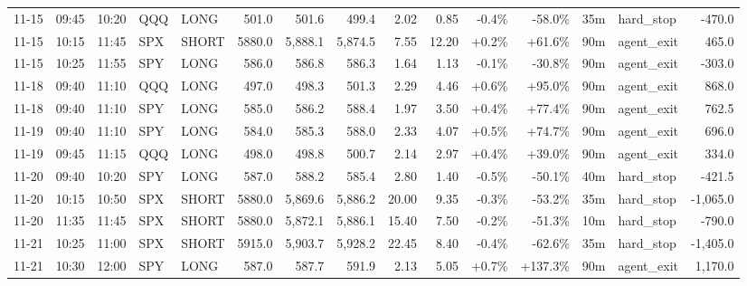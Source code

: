 \documentclass[11pt,a4paper,twoside]{article}
\begin{document}
\begin{landscape}
\begin{center}
\begin{longtable}{>{\color{txtmain}}l l l l l r r r r r r r r >{\color{txtmain}}l r}
11-15 & 09:45 & 10:20 & QQQ & LONG & 501.0 & 501.6 & 499.4 & 2.02 & 0.85 & \textcolor{lossred}{-0.4\%} & \textcolor{lossred}{-58.0\%} & 35m & hard\_stop & \textcolor{lossred}{-470.0} \\
11-15 & 10:15 & 11:45 & SPX & SHORT & 5880.0 & 5,888.1 & 5,874.5 & 7.55 & 12.20 & \textcolor{wingreen}{+0.2\%} & \textcolor{wingreen}{+61.6\%} & 90m & agent\_exit & \textcolor{wingreen}{465.0} \\
11-15 & 10:25 & 11:55 & SPY & LONG & 586.0 & 586.8 & 586.3 & 1.64 & 1.13 & \textcolor{lossred}{-0.1\%} & \textcolor{lossred}{-30.8\%} & 90m & agent\_exit & \textcolor{lossred}{-303.0} \\
11-18 & 09:40 & 11:10 & QQQ & LONG & 497.0 & 498.3 & 501.3 & 2.29 & 4.46 & \textcolor{wingreen}{+0.6\%} & \textcolor{wingreen}{+95.0\%} & 90m & agent\_exit & \textcolor{wingreen}{868.0} \\
11-18 & 09:40 & 11:10 & SPY & LONG & 585.0 & 586.2 & 588.4 & 1.97 & 3.50 & \textcolor{wingreen}{+0.4\%} & \textcolor{wingreen}{+77.4\%} & 90m & agent\_exit & \textcolor{wingreen}{762.5} \\
11-19 & 09:40 & 11:10 & SPY & LONG & 584.0 & 585.3 & 588.0 & 2.33 & 4.07 & \textcolor{wingreen}{+0.5\%} & \textcolor{wingreen}{+74.7\%} & 90m & agent\_exit & \textcolor{wingreen}{696.0} \\
11-19 & 09:45 & 11:15 & QQQ & LONG & 498.0 & 498.8 & 500.7 & 2.14 & 2.97 & \textcolor{wingreen}{+0.4\%} & \textcolor{wingreen}{+39.0\%} & 90m & agent\_exit & \textcolor{wingreen}{334.0} \\
11-20 & 09:40 & 10:20 & SPY & LONG & 587.0 & 588.2 & 585.4 & 2.80 & 1.40 & \textcolor{lossred}{-0.5\%} & \textcolor{lossred}{-50.1\%} & 40m & hard\_stop & \textcolor{lossred}{-421.5} \\
11-20 & 10:15 & 10:50 & SPX & SHORT & 5880.0 & 5,869.6 & 5,886.2 & 20.00 & 9.35 & \textcolor{lossred}{-0.3\%} & \textcolor{lossred}{-53.2\%} & 35m & hard\_stop & \textcolor{lossred}{-1,065.0} \\
11-20 & 11:35 & 11:45 & SPX & SHORT & 5880.0 & 5,872.1 & 5,886.1 & 15.40 & 7.50 & \textcolor{lossred}{-0.2\%} & \textcolor{lossred}{-51.3\%} & 10m & hard\_stop & \textcolor{lossred}{-790.0} \\
11-21 & 10:25 & 11:00 & SPX & SHORT & 5915.0 & 5,903.7 & 5,928.2 & 22.45 & 8.40 & \textcolor{lossred}{-0.4\%} & \textcolor{lossred}{-62.6\%} & 35m & hard\_stop & \textcolor{lossred}{-1,405.0} \\
11-21 & 10:30 & 12:00 & SPY & LONG & 587.0 & 587.7 & 591.9 & 2.13 & 5.05 & \textcolor{wingreen}{+0.7\%} & \textcolor{wingreen}{+137.3\%} & 90m & agent\_exit & \textcolor{wingreen}{1,170.0} \\

\end{longtable}
\end{center}
\end{landscape}
\end{document}
